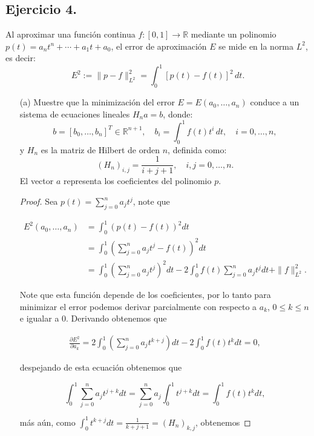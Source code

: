 
\subsection*{Ejercicio 4.}
Al aproximar una función continua $f : [0, 1] \to \mathbb{R}$ mediante un polinomio $p(t) = a_n t^n + \cdots + a_1 t + a_0$, el error de aproximación $E$ se mide en la norma $L^2$, es decir:
\[
E^2 := \|p - f\|_{L^2}^2 = \int_0^1 [p(t) - f(t)]^2 \, dt.
\]

\begin{enumerate}
    \item[(a)] Muestre que la minimización del error $E = E(a_0, \ldots, a_n)$ conduce a un sistema de ecuaciones lineales $H_n a = b$, donde:
    \[
    b = [b_0, \ldots, b_n]^T \in \mathbb{R}^{n+1}, \quad b_i = \int_0^1 f(t)t^i \, dt, \quad i = 0, \ldots, n,
    \]
    y $H_n$ es la matriz de Hilbert de orden $n$, definida como:
    \[
    (H_n)_{i,j} = \frac{1}{i + j + 1}, \quad i, j = 0, \ldots, n.
    \]
    El vector $a$ representa los coeficientes del polinomio $p$.\\

    \begin{proof}
    Sea $p(t)=\displaystyle\sum_{j=0}^{n} a_jt^j$, note que 

    \begin{align*}
        E^2(a_0,\ldots,a_n)&=\int_0^1\left(p(t)-f(t)\right)^2dt\\
        &=\int_0^1\left(\sum_{j=0}^{n} a_jt^j-f(t)\right)^2dt\\
        &=\int_0^1\left(\sum_{j=0}^{n} a_jt^j\right)^2dt-2\int_0^1f(t)\sum_{j=0}^{n} a_jt^j dt+\|f\|_{L^2}^2
    .\end{align*}

    Note que esta función depende de los coeficientes, por lo tanto para minimizar el error podemos derivar parcialmente con respecto a $a_k$, $0\leq k\leq n$ e igualar a 0. Derivando obtenemos que

    \begin{align*}
        \frac{\partial E^2}{\partial a_k}=2\int_0^1\left(\sum_{j=0}^{n} a_jt^{k+j}\right)dt-2\int_0^1f(t)t^kdt=0 
    ,\end{align*}
    
    despejando de esta ecuación obtenemos que

    $$\int_0^1\sum_{j=0}^{n} a_jt^{j+k}dt=\sum_{j=0}^{n} a_j\int_0^1t^{j+k}dt=\int_0^1f(t)t^k dt,$$

    más aún, como $\displaystyle\int_0^1t^{k+j}dt=\frac{1}{k+j+1}=(H_n)_{k,j}$, obtenemos


\end{proof}
\end{enumerate}
